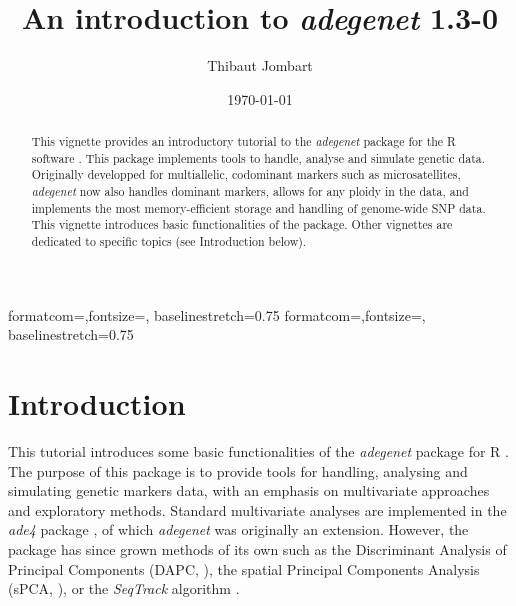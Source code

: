 \documentclass{article}
\title{An introduction to \textit{adegenet} 1.3-0}
\author{Thibaut Jombart}
\date{\today}
\begin{document}
{formatcom={\color{Sinput}},fontsize=\footnotesize, baselinestretch=0.75}
{formatcom={\color{Soutput}},fontsize=\footnotesize, baselinestretch=0.75}

\color{black}

\maketitle

\begin{abstract}
  This vignette provides an introductory tutorial to the \textit{adegenet} package \cite{tjart05}
  for the R software \cite{np145}. This package implements tools to handle, analyse and simulate
  genetic data.  Originally developped for multiallelic, codominant markers such as microsatellites,
  \textit{adegenet} now also handles dominant markers, allows for any ploidy in the data, and
  implements the most memory-efficient storage and handling of genome-wide SNP data. This vignette
  introduces basic functionalities of the package. Other vignettes are dedicated to specific topics
  (see Introduction below).
\end{abstract}


\newpage
\tableofcontents




\newpage
\section{Introduction}
This tutorial introduces some basic functionalities of the \textit{adegenet} package for R \cite{np145}.
The purpose of this package is to provide tools for handling, analysing and simulating genetic
markers data, with an emphasis on multivariate approaches and exploratory methods.
Standard multivariate analyses are implemented in the \textit{ade4} package \cite{tj311}, of which
\textit{adegenet} was originally an extension.
However, the package has since grown methods of its own such as the Discriminant Analysis of
Principal Components (DAPC, \cite{tjart19}), the spatial Principal Components Analysis (sPCA,
\cite{tjart04}), or the \textit{SeqTrack} algorithm \cite{tjart20}.
\end{document}
